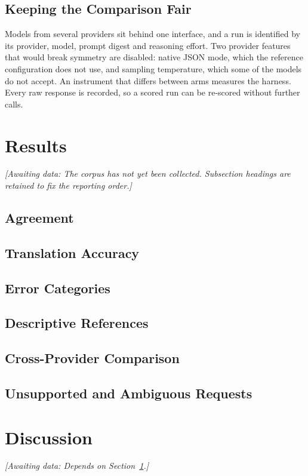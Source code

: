 \documentclass[sigconf,screen,review,anonymous]{acmart}
\newcommand{\awaitingdata}[1]{%
  \par\noindent\textit{[Awaiting data: #1]}\par}
\begin{document}
\subsection{Keeping the Comparison Fair}

Models from several providers sit behind one interface, and a run is
identified by its provider, model, prompt digest and reasoning effort. Two
provider features that would break symmetry are disabled: native JSON mode,
which the reference configuration does not use, and sampling temperature,
which some of the models do not accept. An instrument that differs between
arms measures the harness. Every raw response is recorded, so a scored run can
be re-scored without further calls.

\section{Results}
\label{sec:ws-results}
\awaitingdata{The corpus has not yet been collected. Subsection headings are
retained to fix the reporting order.}

\subsection{Agreement}
\subsection{Translation Accuracy}
\subsection{Error Categories}
\subsection{Descriptive References}
\subsection{Cross-Provider Comparison}
\subsection{Unsupported and Ambiguous Requests}

\section{Discussion}
\awaitingdata{Depends on Section~\ref{sec:ws-results}.}
\end{document}
